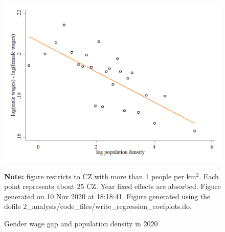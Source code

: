 \begin{figure}[!h]
\centering
\caption{Gender wage gap and population density in 2020}
\includegraphics[width=1\textwidth]{../2_analysis/output/figures/l_czone_density_2020}
\par \begin{minipage}[h]{\textwidth}{\tiny\textbf{Note:} figure restricts to CZ with more than 1 people per km$^2$. Each point represents about 25 CZ. Year fixed effects are absorbed. Figure generated on 10 Nov 2020 at 18:18:41. Figure generated using the dofile 2\_analysis/code\_files/write\_regression\_coefplots.do.}\end{minipage}
\end{figure}
